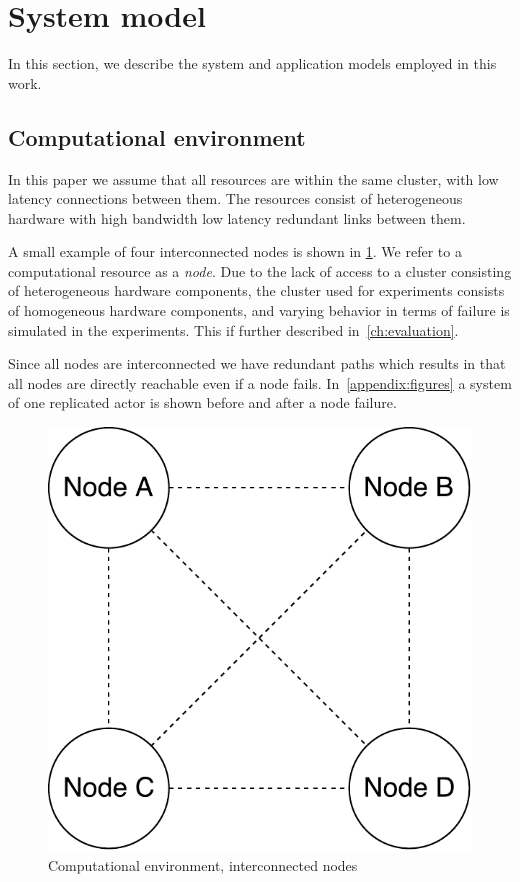 \documentclass{cslthse-msc}
\begin{document}
\section{System model} \label{sec:design_system_model}
In this section, we describe the system and application models employed in this work.

\subsection{Computational environment} \label{subsec:design_comp_env}
In this paper we assume that all resources are within the same cluster, with low latency connections between them. The resources consist of heterogeneous hardware with high bandwidth low latency redundant links between them.

A small example of four interconnected nodes  is shown in \cref{fig:computational_environment}. We refer to a computational resource as a \emph{node}. Due to the lack of access to a cluster consisting of heterogeneous hardware components, the cluster used for experiments consists of homogeneous hardware components, and varying behavior in terms of failure is simulated in the experiments. This if further described in~\cref{ch:evaluation}.

Since all nodes are interconnected we have redundant paths which results in that all nodes are directly reachable even if a node fails. In~\cref{appendix:figures} a system of one replicated actor is shown before and after a node failure.

\begin{figure}[!hbt]
\centering
\includegraphics[scale=0.5]{images/computational_environment.pdf}
\caption{Computational environment, interconnected nodes} \label{fig:computational_environment}
\end{figure}
\end{document}
